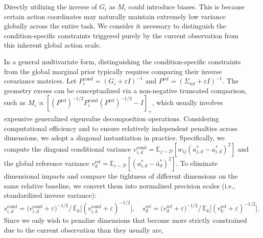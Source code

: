 Directly utilizing the inverse of \(G_i\) as \(M_i\) could introduce biases. 
This is because certain action coordinates may naturally maintain extremely low variance globally across the entire task. 
We consider it necessary to distinguish the condition-specific constraints triggered purely by the current observation from this inherent global action scale.

In a general multivariate form, distinguishing the condition-specific constraints from the global marginal prior typically requires comparing their inverse covariance matrices. Let \(P_i^{\mathrm{cond}} = (G_i + \varepsilon I)^{-1}\) and \(P^{\mathrm{ref}} = (\Sigma_{\text{ref}} + \varepsilon I)^{-1}\). The geometry excess can be conceptualized via a non-negative truncated comparison, such as \(M_i \propto [(P^{\mathrm{ref}})^{-1/2} P_i^{\mathrm{cond}} (P^{\mathrm{ref}})^{-1/2} - I]_+\), which usually involves expensive generalized eigenvalue decomposition operations. Considering computational efficiency and to ensure relatively independent penalties across dimensions, we adopt a diagonal instantiation in practice. 
Specifically, we compute the diagonal conditional variance \(v_{i,d}^{\mathrm{cond}} = \mathbb{E}_{j \sim \mathcal{D}}[w_{ij} (a_{j,d}^* - a_{i,d}^*)^2]\) 
and the global reference variance \(v_d^{\mathrm{ref}} = \mathbb{E}_{i \sim \mathcal{D}} [(a_{i,d}^* - \bar{a}_d^*)^2]\). 
To eliminate dimensional impacts and compare the tightness of different dimensions on the same relative baseline, 
we convert them into normalized precision scales (i.e., standardized inverse variance):
\begin{equation}
    s_{i,d}^{\mathrm{cond}} = \big( v_{i,d}^{\mathrm{cond}} + \varepsilon \big)^{-1/2} \Big/ \, \mathbb{E}_{k}\big[ (v_{i,k}^{\mathrm{cond}} + \varepsilon)^{-1/2} \big], 
    \quad
    s_d^{\mathrm{ref}} = \big( v_d^{\mathrm{ref}} + \varepsilon \big)^{-1/2} \Big/ \, \mathbb{E}_{k}\big[ (v_k^{\mathrm{ref}} + \varepsilon)^{-1/2} \big].
\end{equation}
Since we only wish to penalize dimensions that become more strictly constrained due to the current observation than they usually are, 
